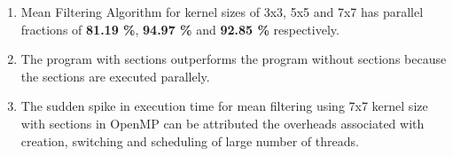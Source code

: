 \documentclass{article}
\begin{document}
\begin{enumerate}
	\item Mean Filtering Algorithm for kernel sizes of 3x3, 5x5 and 7x7 has parallel fractions of \textbf{81.19 \%}, \textbf{94.97 \%} and \textbf{92.85 \%} respectively.
	
	\item The program with sections outperforms the program without sections because the sections are executed parallely.
	
	\item The sudden spike in execution time for mean filtering using 7x7 kernel size with sections in OpenMP can be attributed the overheads associated with creation, switching and scheduling of large number of threads.
	
\end{enumerate}
\end{document}
